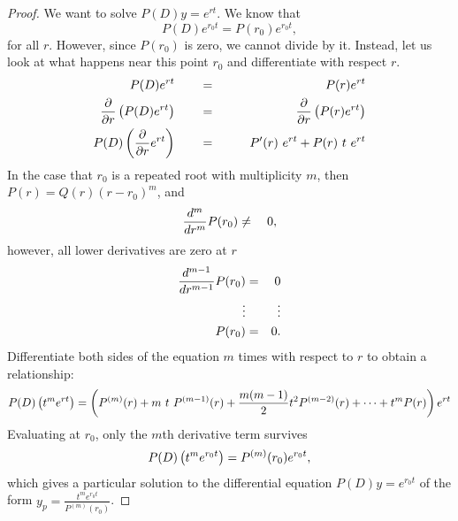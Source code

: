 \begin{proof}
  We want to solve $P(D)y = e^{rt}$. We know that
  \begin{equation*}
    P(D)e^{r_0t} = P(r_0)e^{r_0t},
  \end{equation*}
  for all $r$. However, since $P(r_0)$ is zero, we cannot divide by it.
  Instead, let us look at what happens near this point $r_0$ and differentiate with
  respect $r$.
  \begin{eqnarray*}
    \displaystyle  \displaystyle P(D)e^{rt} \qquad
    \displaystyle &=&
                      \qquad \displaystyle  P(r)e^{rt} \\
    \displaystyle \frac{\partial }{\partial r}\left(P(D)e^{rt}\right) \qquad
    \displaystyle &=&
                      \qquad \displaystyle \frac{\partial }{\partial r}\left( P(r)e^{rt}\right) \\
    \displaystyle P(D)\left(\frac{\partial }{\partial r}e^{rt}\right) \qquad
    \displaystyle &=&
                      \qquad \displaystyle  P'(r)\  e^{rt} + P(r)\  t\  e^{rt}
  \end{eqnarray*}
  In the case that $r_0$ is a repeated root with multiplicity $m$, then $P(r) = Q(r)(r-r_0)^{m}$,
  and
  \begin{equation*}
    \displaystyle  \displaystyle \frac{d^{m}}{dr^ m}P(r_0) \displaystyle  \neq \quad 0,
  \end{equation*}
  however, all lower derivatives are zero at $r$
  \begin{align*}
    \displaystyle  \displaystyle \frac{d^{m-1}}{dr^{m-1}}P(r_0)
    \displaystyle  &=& \displaystyle  0 \\
    \displaystyle \quad \vdots & & \displaystyle  \vdots \\
    \displaystyle P(r_0) \displaystyle  &=& \displaystyle  0.
  \end{align*}
  Differentiate both sides of the equation $m$ times with respect to $r$ to obtain a relationship:
  \begin{equation*}
    \displaystyle  \displaystyle P(D)\left(t^ m e^{rt}\right)
    \displaystyle  =
    \displaystyle  \left(P^{(m)}(r) + m\  t\  P^{(m-1)}(r)
      + \frac{m(m-1)}2 t^2P^{(m-2)}(r) + \dotsb + t^ mP(r)\right)e^{rt}
  \end{equation*}
  Evaluating at $r_0$, only the $m$th derivative term survives
  \begin{equation*}
    \displaystyle  \displaystyle P(D)\left(t^ m e^{r_0t}\right)
    \displaystyle  = \displaystyle  P^{(m)}(r_0)e^{r_0t},
  \end{equation*}
  which gives a particular solution to the differential equation
  $P(D)y = e^{r_0t}$ of the form
  $\displaystyle y_ p= \frac{t^ me^{r_0t}}{P^{(m)}(r_0)}$. 
\end{proof}
\clearpage
